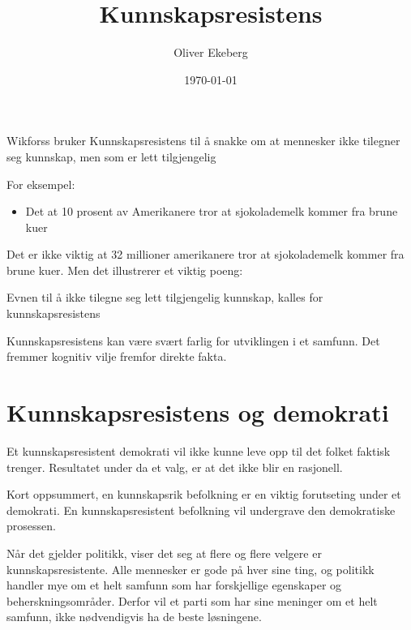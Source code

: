 \documentclass[11pt]{article}
\title{Kunnskapsresistens}
\author{Oliver Ekeberg}
\date{\today}
\begin{document}
\maketitle



\tableofcontents
\vspace{1em}
\vspace{1em}
\vspace{1em}
\vspace{1em}

Wikforss bruker Kunnskapsresistens til å snakke om at mennesker ikke tilegner seg kunnskap, men som er lett tilgjengelig

For eksempel:

\begin{itemize}
    \item Det at 10 prosent av Amerikanere tror at sjokolademelk kommer fra brune kuer
\end{itemize}


Det er ikke viktig at 32 millioner amerikanere tror at sjokolademelk kommer fra brune kuer. Men det illustrerer et viktig poeng:

\vspace{1em}
Evnen til å ikke tilegne seg lett tilgjengelig kunnskap, kalles for kunnskapsresistens

Kunnskapsresistens kan være svært farlig for utviklingen i et samfunn. Det fremmer kognitiv vilje fremfor direkte fakta.

\section{Kunnskapsresistens og demokrati}

Et kunnskapsresistent demokrati vil ikke kunne leve opp til det folket faktisk trenger. Resultatet under da et valg, er at det ikke blir en rasjonell.

\vspace{1em}
Kort oppsummert, en kunnskapsrik befolkning er en viktig forutseting under et demokrati. En kunnskapsresistent befolkning vil undergrave den demokratiske prosessen.


Når det gjelder politikk, viser det seg at flere og flere velgere er kunnskapsresistente. Alle mennesker er gode på hver sine ting, og politikk handler mye om et helt samfunn som har forskjellige egenskaper og beherskningsområder. Derfor vil et parti som har sine meninger om et helt samfunn, ikke nødvendigvis ha de beste løsningene. 
\end{document}
